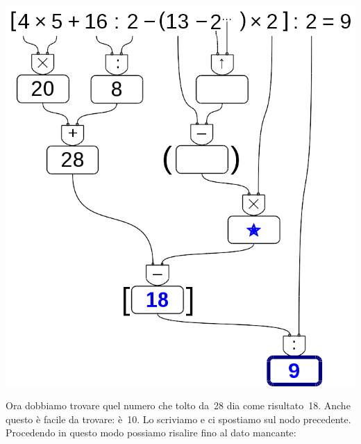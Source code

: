 \begin{exrig}
\begin{esempio}
\begin{inaccessibleblock}[]
 \begin{center}
  \includegraphics[scale=0.35]{img/op_buco2.png}
 \end{center}
\end{inaccessibleblock}
 
  Ora dobbiamo trovare quel numero che tolto da~28 dia come risultato~18. 
  Anche questo è facile da trovare: è~10. Lo scriviamo e ci spostiamo
  sul nodo precedente. Procedendo in questo modo possiamo risalire fino
  al dato mancante:
  

\end{esempio}
\end{exrig}
